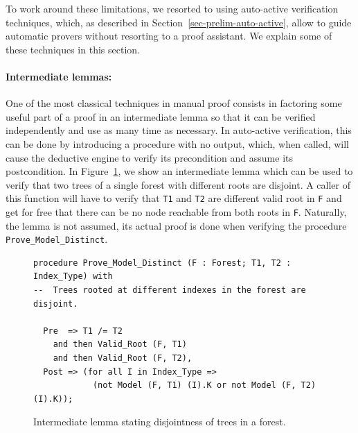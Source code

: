 \documentclass{llncs}
\begin{document}
To work around these limitations, we resorted to using auto-active verification techniques, which,
as described in Section~\ref{sec-prelim-auto-active}, allow to guide automatic provers without
resorting to a proof assistant. We explain some of these techniques in this section.

\paragraph{Intermediate lemmas:}
One of the most classical techniques in manual proof consists in factoring some useful
part of a proof in an intermediate lemma so that it can be verified independently and
use as many time as necessary. In auto-active verification, this can be done by introducing
a procedure with no output, which, when called, will cause the deductive engine to verify
its precondition and assume its postcondition. In Figure~\ref{fig-proof-lem}, we show an
intermediate lemma which can be used to verify that two trees of a single forest with different
roots are disjoint. A caller of this function will have to verify that \texttt{T1} and \texttt{T2} are different
valid root in \texttt{F} and get for free that there can be no node reachable from both roots in \texttt{F}.
Naturally, the lemma is not assumed, its actual proof is done when verifying the procedure
\texttt{Prove\_Model\_Distinct}.

\begin{figure}
\begin{small}
\begin{lstlisting}
procedure Prove_Model_Distinct (F : Forest; T1, T2 : Index_Type) with
--  Trees rooted at different indexes in the forest are disjoint.

  Pre  => T1 /= T2
    and then Valid_Root (F, T1)
    and then Valid_Root (F, T2),
  Post => (for all I in Index_Type =>
            (not Model (F, T1) (I).K or not Model (F, T2) (I).K));
\end{lstlisting}
\end{small}
\caption{\label{fig-proof-lem} Intermediate lemma stating disjointness of trees in a forest.}
\end{figure}
\end{document}
